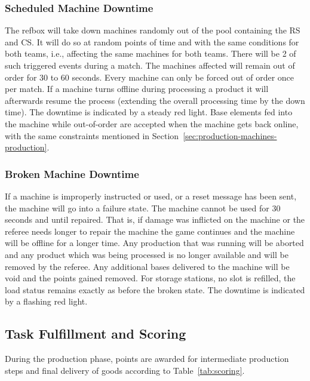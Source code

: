 \documentclass[12pt,twoside]{article}
\newcommand{\refsec}[1]{Section~\ref{#1}}
\newcommand{\reftab}[1]{Table~\ref{#1}}
\begin{document}
\subsubsection{Scheduled Machine Downtime}
\label{sec:out-of-order}
The refbox will take down machines randomly out of the pool containing
the RS and CS\@. It will do so at random points of time and with the
same conditions for both teams, i.e., affecting the same machines for
both teams. There will be 2 of such triggered events during a
match. The machines affected will remain out of order for 30 to 60
seconds. Every machine can only be forced out of order once per
match. If a machine turns offline during processing a product it will
afterwards resume the process (extending the overall processing time
by the down time). The downtime is indicated by a steady red
light. Base elements fed into the machine while out-of-order are
accepted when the machine gets back online, with the same constraints
mentioned in \refsec{sec:production-machines-production}.

\subsubsection{Broken Machine Downtime}
\label{sec:broken-machine}
If a machine is improperly instructed or used, or a reset message has
been sent, the machine will go into a failure state. The machine cannot be
used for 30 seconds and until repaired. That is, if damage was
inflicted on the machine or the referee needs longer to repair the
machine the game continues and the machine will be offline for a
longer time. Any production that was running will be aborted and any
product which was being processed is no longer available and will be
removed by the referee. Any additional bases delivered to the machine
will be void and the points gained removed. For storage stations, no
slot is refilled, the load status remains exactly as before the broken
state. The downtime is indicated by a flashing red light.

\subsection{Task Fulfillment and Scoring}
\label{sec:production-scoring}
During the production phase, points are awarded for intermediate
production steps and final delivery of goods according to
\reftab{tab:scoring}.
\end{document}
